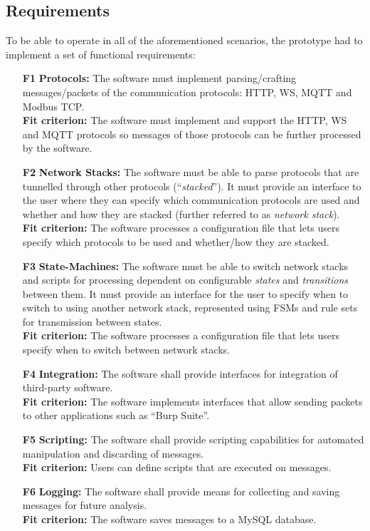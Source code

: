 \subsection{Requirements}
To be able to operate in all of the aforementioned scenarios, the prototype had to implement a set of functional requirements:
\begin{itemize}
    \item [\textbf{F1}] \textbf{Protocols:} The software must implement parsing/crafting messages/packets of the communication protocols: \ac{HTTP}, \ac{WS}, \ac{MQTT} and Modbus \ac{TCP}. \\
          \textbf{Fit criterion:} The software must implement and support the \ac{HTTP}, \ac{WS} and \ac{MQTT} protocols so messages of those protocols can be further processed by the software.
    \item [\textbf{F2}] \textbf{Network Stacks:} The software must be able to parse protocols that are tunnelled through other protocols (\enquote{\emph{stacked}}). It must provide an interface to the user where they can specify which communication protocols are used and whether and how they are stacked (further referred to as \emph{network stack}).\\
          \textbf{Fit criterion:} The software processes a configuration file that lets users specify which protocols to be used and whether/how they are stacked.
    \item [\textbf{F3}] \textbf{State-Machines:} The software must be able to switch network stacks and scripts for processing dependent on configurable \emph{states} and \emph{transitions} between them. It must provide an interface for the user to specify when to switch to using another network stack, represented using \acp{FSM} and rule sets for transmission between states.\\
          \textbf{Fit criterion:} The software processes a configuration file that lets users specify when to switch between network stacks.
    \item [\textbf{F4}] \textbf{Integration:} The software shall provide interfaces for integration of third-party software.\\
          \textbf{Fit criterion:} The software implements interfaces that allow sending packets to other applications such as \enquote{Burp Suite}.
    \item [\textbf{F5}] \textbf{Scripting:} The software shall provide scripting capabilities for automated manipulation and discarding of messages.\\
          \textbf{Fit criterion:} Users can define scripts that are executed on messages.
    \item[\textbf{F6}] \textbf{Logging:} The software shall provide means for collecting and saving messages for future analysis.\\
          \textbf{Fit criterion:} The software saves messages to a MySQL database.
\end{itemize}

